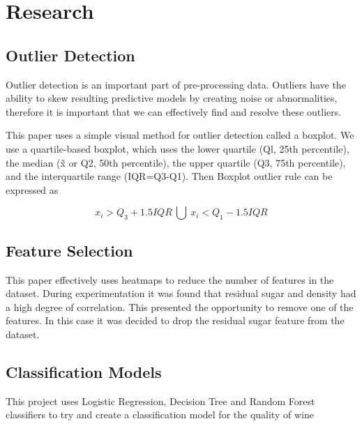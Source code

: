 \section{Research}

\subsection{Outlier Detection}

Outlier detection is an important part of pre-processing data. Outliers have the ability to skew resulting predictive models by creating noise or abnormalities, therefore it is important that we can effectively find and resolve these outliers.

This paper uses a simple visual method for outlier detection called a boxplot.
We use a quartile-based boxplot, which uses the lower quartile (Ql, 25th percentile), the median (x̃  or Q2, 50th percentile), the upper quartile (Q3, 75th percentile), and the interquartile range (IQR=Q3-Q1). Then Boxplot outlier rule can be expressed as\cite{6520712}

\begin{equation}
x_{i} > Q_{3}+1.5IQR\ \bigcup \ x_{i} < Q_{1}-1.5IQR
\end{equation}

\subsection{Feature Selection}

This paper effectively uses heatmaps to reduce the number of features in the dataset. During experimentation it was found that residual sugar and density had a high degree of correlation. This presented the opportunity to remove one of the features. In this case it was decided to drop the residual sugar feature from the dataset.

\subsection{Classification Models}

This project uses Logistic Regression, Decision Tree and Random Forest classifiers to try and create a classification model for the quality of wine

